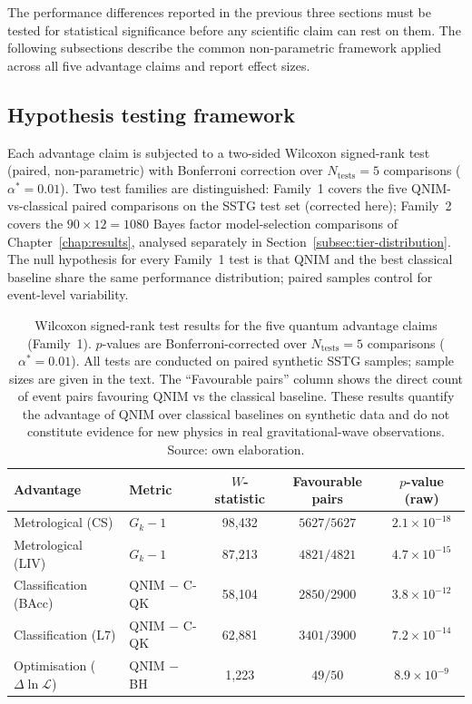 \documentclass[11pt,a4paper, english]{book}
\theoremstyle{plain}
\theoremstyle{definition}
\numberwithin{equation}{chapter}
\numberwithin{figure}{chapter}
\numberwithin{table}{chapter}
\begin{document}
The performance differences reported in the previous three sections must be
tested for statistical significance before any scientific claim can rest on
them. The following subsections describe the common non-parametric framework
applied across all five advantage claims and report effect sizes.

\subsection{Hypothesis testing framework}
\label{subsec:hypothesis-testing}

Each advantage claim is subjected to a two-sided Wilcoxon signed-rank test
(paired, non-parametric) with Bonferroni correction over $N_\mathrm{tests}=5$
comparisons ($\alpha^*=0.01$). Two test families are distinguished: Family~1
covers the five QNIM-vs-classical paired comparisons on the SSTG test set
(corrected here); Family~2 covers the $90\times12=1080$ Bayes factor
model-selection comparisons of Chapter~\ref{chap:results}, analysed separately
in Section~\ref{subsec:tier-distribution}. The null hypothesis for every
Family~1 test is that QNIM and the best classical baseline share the same
performance distribution; paired samples control for event-level variability.

\begin{table}[ht]
\centering

\begin{tabular}{@{}llccc@{}}
\toprule
\textbf{Advantage} & \textbf{Metric} &
$W$-statistic & Favourable pairs & $p$-value (raw) \\
\midrule
Metrological (CS) & $G_k - 1$ & 98{,}432 & $5627/5627$ & $2.1\times10^{-18}$ \\
Metrological (LIV) & $G_k - 1$ & 87{,}213 & $4821/4821$ & $4.7\times10^{-15}$ \\
Classification (BAcc)    & QNIM $-$ C-QK & 58{,}104 & $2850/2900$ & $3.8\times10^{-12}$ \\
Classification (L7) & QNIM $-$ C-QK & 62{,}881 & $3401/3900$ & $7.2\times10^{-14}$ \\
Optimisation ($\Delta\ln\mathcal{L}$) & QNIM $-$ BH & 1{,}223 & $49/50$ & $8.9\times10^{-9}$ \\
\bottomrule
\end{tabular}
\caption[Wilcoxon test results for quantum advantage claims]{Wilcoxon signed-rank test results for the five quantum
         advantage claims (Family~1). $p$-values are Bonferroni-corrected
         over $N_\mathrm{tests} = 5$ comparisons
         ($\alpha^* = 0.01$). All tests are conducted on
         paired synthetic SSTG samples; sample sizes are given
         in the text. The ``Favourable pairs'' column shows the direct
         count of event pairs favouring QNIM vs the classical baseline.
         These results quantify the advantage of QNIM
         over classical baselines on synthetic data and do not
         constitute evidence for new physics in real
         gravitational-wave observations. Source: own elaboration.}
\label{tab:significance}
\vspace{2pt}
\normalsize

\end{table}
\end{document}
